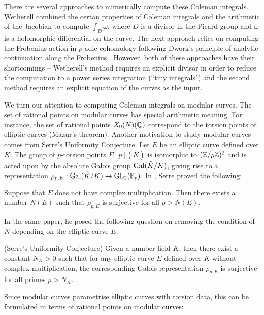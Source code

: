 There are several approaches to numerically compute these Coleman integrals. Wetherell \cite{wetherell} combined the certan properties of Coleman integrals and the arithmetic of the Jacobian to compute $\int_D \omega$, where $D$ is a divisor in the Picard group and $\omega$ is a holomorphic differential on the curve. The next approach relies on computing the Frobenius action in $p$-adic cohomology following Dwork's principle of analytic continuation along the Frobenius \cite{BBK10,Tui16,Tui17,BT_coleman}. However, both of these approaches have their shortcomings -- Wetherell's method requires an explicit divisor in order to reduce the computation to a power series integration (``tiny integrals") and the second method requires an explicit equation of the curves as the input.

We turn our attention to computing Coleman integrals on modular curves. The set of rational points on modular curves has special arithmetic meaning. For instance, the set of rational points $X_0(N)(\mathbb{Q})$ correspond to the torsion points of elliptic curves (Mazur's theorem). Another motivation to study modular curves comes from Serre's Uniformity Conjecture. Let $E$ be an elliptic curve defined over $K$. The group of $p$-torsion points $E[p](\bar{K})$ is isomorphic to $(\mathbb{Z}/p\mathbb{Z})^2$ and is acted upon by the absolute Galois group $\operatorname{Gal}(\bar{K}/K)$, giving rise to a representation $\rho_ {p,E}: \operatorname{Gal}(\bar{K}/K) \rightarrow \operatorname{GL}_2(\mathbb{F}_p)$. In \cite{serre72}, Serre proved the following:

\begin{theorem}
    Suppose that $E$ does not have complex multiplication. Then there exists a number $N(E)$ such that $\rho_{p,E}$ is surjective for all $p > N(E)$.
\end{theorem}

In the same paper, he posed the following question on removing the condition of $N$ depending on the elliptic curve $E$:

\begin{conj}{(Serre's Uniformity Conjecture)}
Given a number field $K$, then there exist a constant $N_K>0$ such that for any elliptic curve $E$ defined over $K$ without complex multiplication, the corresponding Galois representation $\rho_{p,E}$ is surjective for all primes $p > N_K$.
\end{conj}

Since modular curves parametrise elliptic curves with torsion data, this can be formulated in terms of rational points on modular curves:

